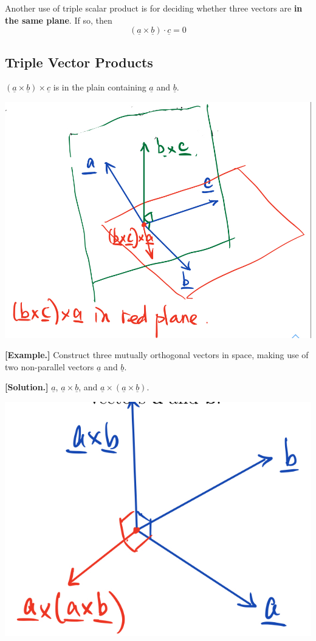 \documentclass[11pt, a4paper]{MATH2023}
\newcommand{\eg}{\textbf{[Example.] }}
\newcommand{\sol}{\textbf{[Solution.] }}
\newcommand{\va}{\underline{a}}
\newcommand{\bb}{\underline{b}}
\newcommand{\cc}{\underline{c}}
\begin{document}
\begin{spacing}{1.3}
    Another use of triple scalar product is for deciding whether three 
    vectors are {\bf in the same plane}. If so, then $$(\va\times \bb)\cdot \cc=0$$

    \subsection{Triple Vector Products}

    $(\va\times \bb)\times \cc$ is in the plain containing $\va$ and $\bb$.
    \begin{center}
        \includegraphics[scale=0.25]{images/Ch10-triple-cross-prod.jpeg}
    \end{center}

    \eg Construct three mutually orthogonal vectors in space, making use of 
    two non-parallel vectors $\va$ and $\bb$.

    \sol $\va$, $\va\times \bb$, and $\va\times(\va\times \bb)$.
    \begin{center}
        \includegraphics[scale=0.27]{images/Ch10-mutually-orth.jpeg}
    \end{center}


\end{spacing}
\end{document}
